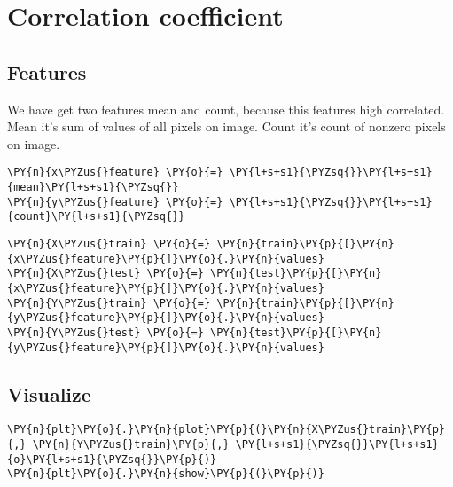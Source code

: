 \section*{Correlation coefficient}
\subsection*{Features}
We have get two features mean and count, because this features high correlated. Mean it's sum of values of all pixels on image. Count it's count of nonzero pixels on image.
    \begin{tcolorbox}[breakable, size=fbox, boxrule=1pt, pad at break*=1mm,colback=cellbackground, colframe=cellborder]
\begin{Verbatim}[commandchars=\\\{\}]
\PY{n}{x\PYZus{}feature} \PY{o}{=} \PY{l+s+s1}{\PYZsq{}}\PY{l+s+s1}{mean}\PY{l+s+s1}{\PYZsq{}}
\PY{n}{y\PYZus{}feature} \PY{o}{=} \PY{l+s+s1}{\PYZsq{}}\PY{l+s+s1}{count}\PY{l+s+s1}{\PYZsq{}}
\end{Verbatim}
\end{tcolorbox}

    \begin{tcolorbox}[breakable, size=fbox, boxrule=1pt, pad at break*=1mm,colback=cellbackground, colframe=cellborder]
\begin{Verbatim}[commandchars=\\\{\}]
\PY{n}{X\PYZus{}train} \PY{o}{=} \PY{n}{train}\PY{p}{[}\PY{n}{x\PYZus{}feature}\PY{p}{]}\PY{o}{.}\PY{n}{values}
\PY{n}{X\PYZus{}test} \PY{o}{=} \PY{n}{test}\PY{p}{[}\PY{n}{x\PYZus{}feature}\PY{p}{]}\PY{o}{.}\PY{n}{values}
\PY{n}{Y\PYZus{}train} \PY{o}{=} \PY{n}{train}\PY{p}{[}\PY{n}{y\PYZus{}feature}\PY{p}{]}\PY{o}{.}\PY{n}{values}
\PY{n}{Y\PYZus{}test} \PY{o}{=} \PY{n}{test}\PY{p}{[}\PY{n}{y\PYZus{}feature}\PY{p}{]}\PY{o}{.}\PY{n}{values}
\end{Verbatim}
\end{tcolorbox}

\subsection*{Visualize}
    \begin{tcolorbox}[breakable, size=fbox, boxrule=1pt, pad at break*=1mm,colback=cellbackground, colframe=cellborder]
\begin{Verbatim}[commandchars=\\\{\}]
\PY{n}{plt}\PY{o}{.}\PY{n}{plot}\PY{p}{(}\PY{n}{X\PYZus{}train}\PY{p}{,} \PY{n}{Y\PYZus{}train}\PY{p}{,} \PY{l+s+s1}{\PYZsq{}}\PY{l+s+s1}{o}\PY{l+s+s1}{\PYZsq{}}\PY{p}{)}
\PY{n}{plt}\PY{o}{.}\PY{n}{show}\PY{p}{(}\PY{p}{)}
\end{Verbatim}
\end{tcolorbox}

